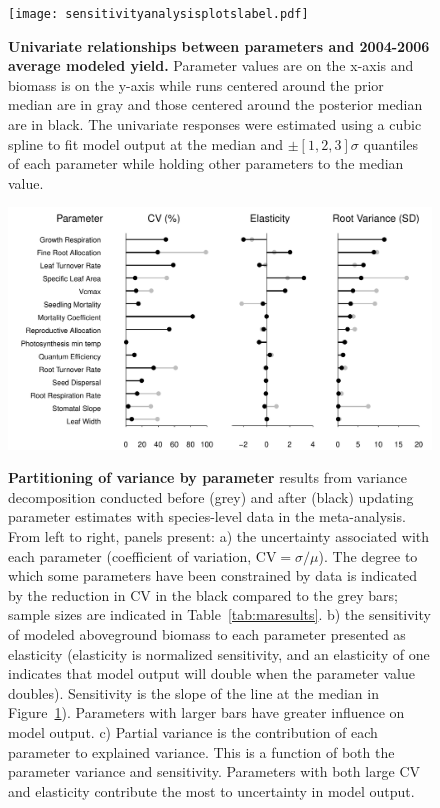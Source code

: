 \documentclass[12pt]{article}
\begin{document}
\begin{flushleft}
\begin{spacing}{1.9}
\begin{figure}[p]
  \caption%
  {{\bf Univariate relationships between parameters and 2004-2006 average modeled yield.} Parameter values are on the x-axis and biomass is on the y-axis while runs centered around the prior median are in gray and those centered around the posterior median are in black. The univariate responses were estimated using a cubic spline to fit model output at the median and $\pm[1,2,3]\sigma$ quantiles of each parameter while holding other parameters to the median value.}
  \begin{center}
    \texttt{[image: sensitivityanalysisplotslabel.pdf]}
  \end{center}
  \label{fig:agbsa}
\end{figure}



\begin{figure}[p]
\caption%
{{\bf Partitioning of variance by parameter} results from variance decomposition conducted before (grey) and after (black) updating parameter estimates with species-level data in the meta-analysis.
 From left to right, panels present: a) the uncertainty associated with each parameter (coefficient of variation, $\text{CV}=\sigma/\mu$).
 The degree to which some parameters have been constrained by data is indicated by the reduction in CV in the black compared to the grey bars; sample sizes are indicated in Table~\ref{tab:maresults}.
  b) the sensitivity of modeled aboveground biomass to each parameter presented as elasticity (elasticity is normalized sensitivity, and an elasticity of one indicates that model output will double when the parameter value doubles).
  Sensitivity is the slope of the line at the median in Figure~\ref{fig:agbsa}). 
  Parameters with larger bars have greater influence on model output.
  c) Partial variance is the contribution of each parameter to explained variance. 
  This is a function of both the parameter variance and sensitivity. 
  Parameters with both large CV and elasticity contribute the most to uncertainty in model output.}
\includegraphics[width=\textwidth]{variancedecomposition.pdf}
\label{fig:vd}
\end{figure}

\clearpage

%

\end{spacing}
\end{flushleft}
\end{document}
